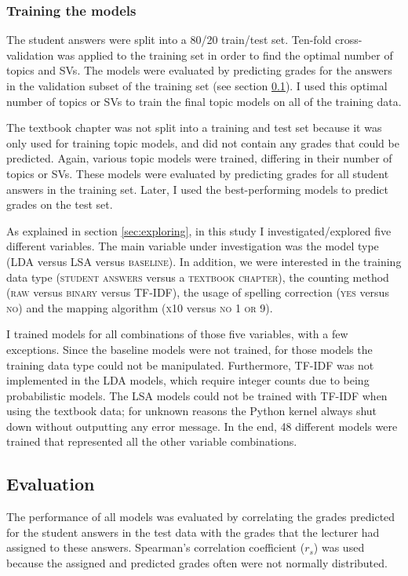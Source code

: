\documentclass[a4paper,10pt,twoside]{article}
\begin{document}
\subsubsection{Training the models}
\label{sec:training}
The student answers were split into a 80/20 train/test set. Ten-fold cross-validation was applied to the training set in order to find the optimal number of topics and SVs. The models were evaluated by predicting grades for the answers in the validation subset of the training set (see section \ref{sec:evaluation}). I used this optimal number of topics or SVs to train the final topic models on all of the training data.

The textbook chapter was not split into a training and test set because it was only used for training topic models, and did not contain any grades that could be predicted. Again, various topic models were trained, differing in their number of topics or SVs. These models were evaluated by predicting grades for all student answers in the training set. Later, I used the best-performing models to predict grades on the test set.

As explained in section \ref{sec:exploring}, in this study I investigated/explored five different variables. The main variable under investigation was the model type (LDA versus LSA versus \textsc{baseline}). In addition, we were interested in the training data type (\textsc{student answers} versus a \textsc{textbook chapter}), the counting method (\textsc{raw} versus \textsc{binary} versus TF-IDF), the usage of spelling correction (\textsc{yes} versus \textsc{no}) and the mapping algorithm (\textsc{x10} versus \textsc{no 1 or 9}).

I trained models for all combinations of those five variables, with a few exceptions. Since the baseline models were not trained, for those models the training data type could not be manipulated. Furthermore, TF-IDF was not implemented in the LDA models, which require integer counts due to being probabilistic models. The LSA models could not be trained with TF-IDF when using the textbook data; for unknown reasons the Python kernel always shut down without outputting any error message. In the end, 48 different models were trained that represented all the other variable combinations.

\subsection{Evaluation}
\label{sec:evaluation}
The performance of all models was evaluated by correlating the grades predicted for the student answers in the test data with the grades that the lecturer had assigned to these answers. Spearman's correlation coefficient ($\textit{r}_s$) was used because the assigned and predicted grades often were not normally distributed.
\end{document}
